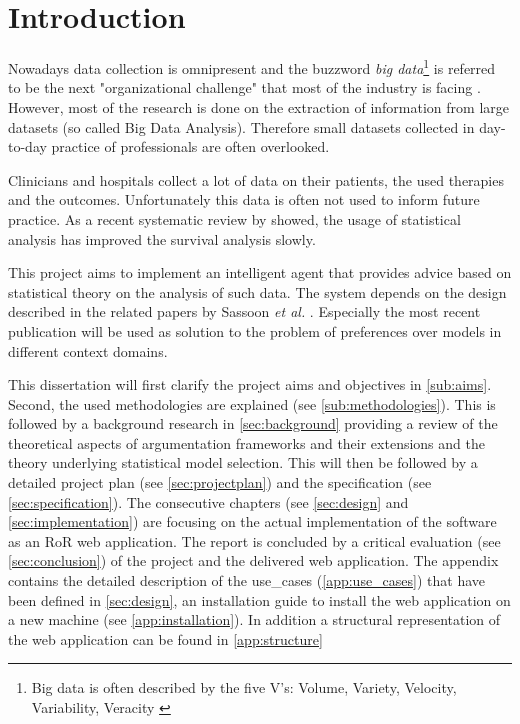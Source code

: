 \section{Introduction}

Nowadays data collection is omnipresent and the buzzword \textit{big data}\footnote{Big data is often described by the five V's: Volume, Variety, Velocity, Variability, Veracity \cite{Hilbert2015}} is referred to be the next "organizational challenge" that most of the industry is facing \cite{bigdata}. However, most of the research is done on the extraction of information from large datasets (so called Big Data Analysis). Therefore small datasets collected in day-to-day practice of professionals are often overlooked. 

Clinicians and hospitals collect a lot of data on their patients, the used therapies and the outcomes. Unfortunately this data is often not used to inform future practice. As a recent systematic review by \cite{survivalAnalysis} showed, the usage of statistical analysis has improved the survival analysis slowly. 

This project aims to implement an intelligent agent that provides advice based on statistical theory on the analysis of such data. The system depends on the design described in the related papers by Sassoon \textit{et al.} \cite{sassoon2014,sassoon2016,sassoon2016CD}. Especially the most recent publication will be used as solution to the problem of preferences over models in different context domains. 


This dissertation will first clarify the project aims and objectives in \autoref{sub:aims}. Second, the used methodologies are explained (see \autoref{sub:methodologies}). This is followed by a background research in \autoref{sec:background} providing a review of the theoretical aspects of argumentation frameworks and their extensions and the theory underlying statistical model selection. 
This will then be followed by a detailed project plan (see \autoref{sec:projectplan}) and the specification (see \autoref{sec:specification}). The consecutive chapters (see \autoref{sec:design} and \ref{sec:implementation}) are focusing on the actual implementation of the software as an \gls{RoR} web application. 
The report is concluded by a critical evaluation (see \autoref{sec:conclusion}) of the project and the delivered web application. 
The appendix contains the detailed description of the \glspl{use_case} (\autoref{app:use_cases}) that have been defined in \autoref{sec:design}, an installation guide to install the web application on a new machine (see \autoref{app:installation}). In addition a structural representation of the web application can be found in \autoref{app:structure}


